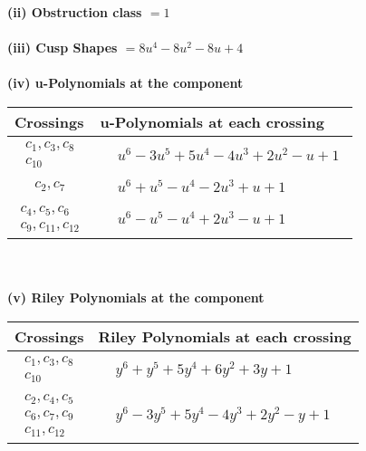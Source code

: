 \documentclass[1p]{elsarticle_modified}
\theoremstyle{definition}
\begin{document}
\flushleft \textbf{(ii) Obstruction class $= 1$}\\~\\
\flushleft \textbf{(iii) Cusp Shapes $= 8 u^4-8 u^2-8 u+4$}\\~\\
\newpage\renewcommand{\arraystretch}{1}
\flushleft \textbf{(iv) u-Polynomials at the component}\newline \\
\begin{tabular}{m{50pt}|m{274pt}}
Crossings & \hspace{64pt}u-Polynomials at each crossing \\
\hline $$\begin{aligned}c_{1},c_{3},c_{8}\\c_{10}\end{aligned}$$&$\begin{aligned}
&u^6-3 u^5+5 u^4-4 u^3+2 u^2- u+1
\end{aligned}$\\
\hline $$\begin{aligned}c_{2},c_{7}\end{aligned}$$&$\begin{aligned}
&u^6+u^5- u^4-2 u^3+u+1
\end{aligned}$\\
\hline $$\begin{aligned}c_{4},c_{5},c_{6}\\c_{9},c_{11},c_{12}\end{aligned}$$&$\begin{aligned}
&u^6- u^5- u^4+2 u^3- u+1
\end{aligned}$\\
\hline
\end{tabular}\\~\\
\newpage\renewcommand{\arraystretch}{1}
\flushleft \textbf{(v) Riley Polynomials at the component}\newline \\
\begin{tabular}{m{50pt}|m{274pt}}
Crossings & \hspace{64pt}Riley Polynomials at each crossing \\
\hline $$\begin{aligned}c_{1},c_{3},c_{8}\\c_{10}\end{aligned}$$&$\begin{aligned}
&y^6+y^5+5 y^4+6 y^2+3 y+1
\end{aligned}$\\
\hline $$\begin{aligned}c_{2},c_{4},c_{5}\\c_{6},c_{7},c_{9}\\c_{11},c_{12}\end{aligned}$$&$\begin{aligned}
&y^6-3 y^5+5 y^4-4 y^3+2 y^2- y+1
\end{aligned}$\\
\hline
\end{tabular}\\~\\
\end{document}
